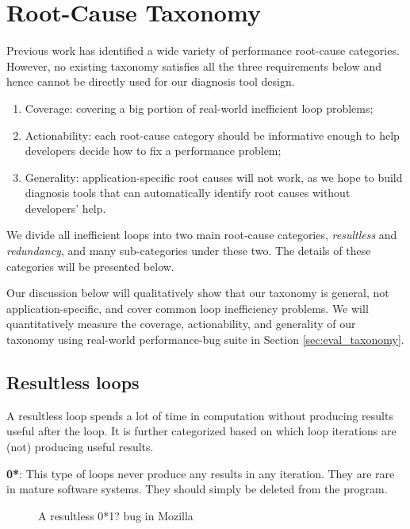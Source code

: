\section{Root-Cause Taxonomy}
\label{sec:study}

Previous work has identified a wide variety of performance root-cause 
categories. However, no existing taxonomy satisfies all the three 
requirements below and hence cannot be directly used for our diagnosis tool
design.
\begin{enumerate}
\item Coverage: covering
a big portion of real-world inefficient loop problems; 
\item Actionability: each root-cause category should be informative enough 
to help developers
decide how to fix a performance problem; 
\item Generality: application-specific root causes will not work, as we
hope to build diagnosis tools that can automatically identify root causes 
without developers' help.
\end{enumerate}


We divide all inefficient loops into two main root-cause categories,
\textit{resultless} and \textit{redundancy}, and many sub-categories under
these two.
The details of these categories will be presented below.

Our discussion below will qualitatively show that 
our taxonomy is general, not application-specific, and
cover common loop inefficiency problems.
We will quantitatively measure the coverage, actionability, and 
generality of our taxonomy
using real-world performance-bug suite in Section \ref{sec:eval_taxonomy}.


\subsection{Resultless loops}
\label{sec:study_resultless}
A resultless loop spends a lot of time in computation without
producing results useful after the loop.
It is further categorized based on which loop iterations are
(not) producing useful results.


{\textbf{0*}}: 
This type of loops never produce any results in any iteration.
They are rare in mature software systems.
They should simply be deleted from the program.

\begin{figure}
\centering
{}
  \mbox{}
\vspace{-0.05in}
\caption{A resultless 0*1? bug in Mozilla}
\label{fig:Mozilla347306}
\end{figure}

